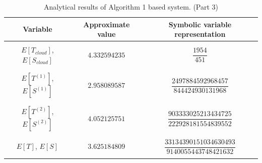\documentclass[10pt,a4paper]{article}
\begin{document}
\begin{table}[h!]
\caption{Analytical results of Algorithm 1 based system. (Part 3)}
\begin{adjustbox}{center=\textwidth}
	
     \begin{tabular}{c|c|c}
     \toprule
     \textbf{Variable} & \textbf{Approximate value} & \textbf{Symbolic variable representation} \\
     \toprule
	 &&\\
	 
	 $E[T_{cloud}]$, $E[S_{cloud}]$ & $4.332594235$ & $\dfrac{1954}{451}$  \\
	 
	 &&\\\hline &&\\
     
     $E[T^{(1)}]$, $E[S^{(1)}]$ & $2.958089587$ & $\dfrac{2497884592968457}{844424930131968}$  \\
     
     &&\\\hline &&\\
     
     $E[T^{(2)}]$, $E[S^{(2)}]$ & $4.052125751$ & $\dfrac{903333025213434725}{222928181554839552}$  \\
     
     &&\\\hline &&\\
     
     $E[T]$, $E[S]$ & $3.625184809$ & $\dfrac{33134390151034630493}{9140055443748421632}$  \\
	
	 &&\\

     \bottomrule

    \end{tabular}
    \end{adjustbox}
\end{table}

\end{document}
